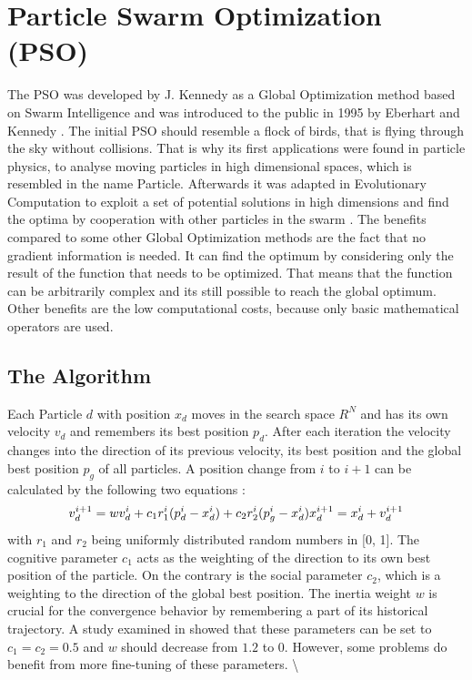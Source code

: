 \documentclass[
  oneside]{book}
\begin{document}
\hypertarget{particle-swarm-optimization-pso}{%
\chapter{Particle Swarm Optimization (PSO)}\label{particle-swarm-optimization-pso}}

The PSO was developed by J. Kennedy as a Global Optimization method based on Swarm Intelligence and was introduced to the public in 1995 by Eberhart and Kennedy \citep{KeEb1995}. The initial PSO should resemble a flock of birds, that is flying through the sky without collisions. That is why its first applications were found in particle physics, to analyse moving particles in high dimensional spaces, which is resembled in the name Particle. Afterwards it was adapted in Evolutionary Computation to exploit a set of potential solutions in high dimensions and find the optima by cooperation with other particles in the swarm \citep{PaVr2002}. The benefits compared to some other Global Optimization methods are the fact that no gradient information is needed. It can find the optimum by considering only the result of the function that needs to be optimized. That means that the function can be arbitrarily complex and its still possible to reach the global optimum. Other benefits are the low computational costs, because only basic mathematical operators are used.

\hypertarget{the-algorithm}{%
\section{The Algorithm}\label{the-algorithm}}

Each Particle \(d\) with position \(x_d\) moves in the search space \(R^N\) and has its own velocity \(v_d\) and remembers its best position \(p_d\). After each iteration the velocity changes into the direction of its previous velocity, its best position and the global best position \(p_g\) of all particles. A position change from \(i\) to \(i+1\) can be calculated by the following two equations \citep{PaVr2002}:
\[
  v_d^{i+1} = wv_d^{i} + c_1 r_1^i (p_d^i-x_d^i) + c_2 r_2^i (p_g^i - x_d^i) \\
  x_d^{i+1} = x_d^i + v_d^{i+1}
\]
with \(r_1\) and \(r_2\) being uniformly distributed random numbers in {[}0, 1{]}. The cognitive parameter \(c_1\) acts as the weighting of the direction to its own best position of the particle. On the contrary is the social parameter \(c_2\), which is a weighting to the direction of the global best position. The inertia weight \(w\) is crucial for the convergence behavior by remembering a part of its historical trajectory. A study examined in \citep{PaVr2002} showed that these parameters can be set to \(c_1=c_2=0.5\) and \(w\) should decrease from \(1.2\) to \(0\). However, some problems do benefit from more fine-tuning of these parameters. \textbackslash{}
\end{document}
